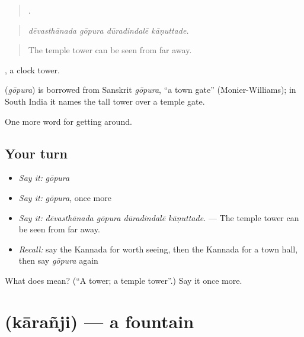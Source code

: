 \begin{quote}
   .
\end{quote}

\begin{quote}
\emph{dēvasthānada gōpura dūradindalē kāṇuttade.}
\end{quote}

\begin{quote}
The temple tower can be seen from far away.
\end{quote}

 , a clock tower.

\begin{cousinweb}
\textbf{} (\emph{gōpura}) is borrowed from Sanskrit \emph{gōpura}, \textquotedblleft{}a town gate\textquotedblright{} (Monier-Williams); in South India it names the tall tower over a temple gate.
\end{cousinweb}

\begin{grammarlens}[title={What you've built}]
One more word for getting around.
\end{grammarlens}

\subsection*{Your turn}
\begin{itemize}
\raggedright
  \item \emph{Say it:} \emph{gōpura}
  \item \emph{Say it:} \emph{gōpura}, once more
  \item \emph{Say it:} \emph{dēvasthānada gōpura dūradindalē kāṇuttade.} — The temple tower can be seen from far away.
  \item \emph{Recall:} say the Kannada for worth seeing, then the Kannada for a town hall, then say \emph{gōpura} again
\end{itemize}

\begin{tcolorbox}[breakable,colback=teal!4,colframe=teal!35!black,title={Before you move on}]
What does  mean? (\textquotedblleft{}A tower; a temple tower\textquotedblright{}.) Say it once more.
\end{tcolorbox}
\section[\texorpdfstring{\kn{ಕಾರಂಜಿ} (kārañji)}{ಕಾರಂಜಿ (kārañji)}]{ (kārañji) — a fountain}

